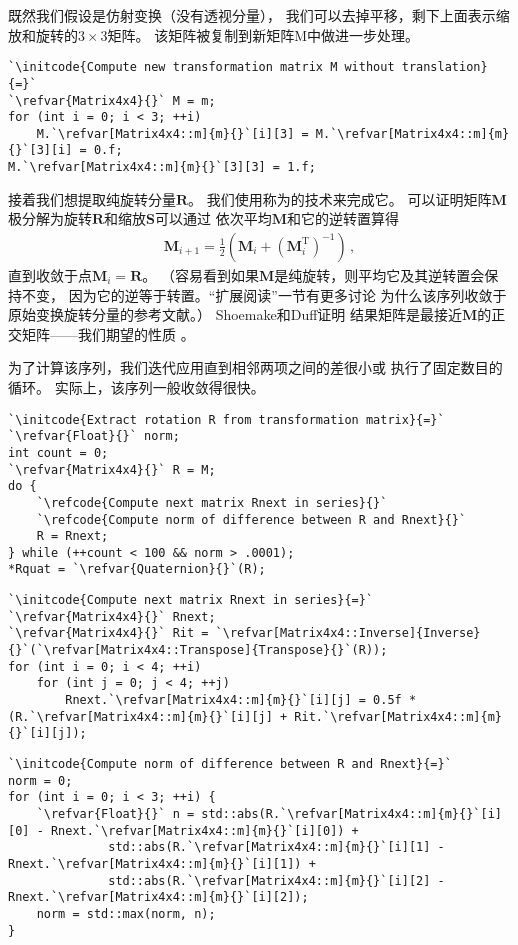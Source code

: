 既然我们假设是仿射变换（没有透视分量），
我们可以去掉平移，剩下上面表示缩放和旋转的$3\times3$矩阵。
该矩阵被复制到新矩阵{\ttfamily M}中做进一步处理。
\begin{lstlisting}
`\initcode{Compute new transformation matrix M without translation}{=}`
`\refvar{Matrix4x4}{}` M = m;
for (int i = 0; i < 3; ++i)
    M.`\refvar[Matrix4x4::m]{m}{}`[i][3] = M.`\refvar[Matrix4x4::m]{m}{}`[3][i] = 0.f;
M.`\refvar[Matrix4x4::m]{m}{}`[3][3] = 1.f;
\end{lstlisting}

接着我们想提取纯旋转分量$\bm R$。
我们使用称为的技术来完成它。
可以证明矩阵$\bm M$极分解为旋转$\bm R$和缩放$\bm S$可以通过
依次平均$\bm M$和它的逆转置算得
\begin{align}\label{eq:2.10}
    \bm M_{i+1}=\frac{1}{2}(\bm M_i+(\bm M_i^\mathrm{T})^{-1})\, ,
\end{align}
直到收敛于点$\bm M_i=\bm R$。
（容易看到如果$\bm M$是纯旋转，则平均它及其逆转置会保持不变，
因为它的逆等于转置。“扩展阅读”一节有更多讨论
为什么该序列收敛于原始变换旋转分量的参考文献。）
Shoemake和Duff\parencite*{10.5555/155294.155324}证明
结果矩阵是最接近$\bm M$的正交矩阵——我们期望的性质
。

为了计算该序列，我们迭代应用直到相邻两项之间的差很小或
执行了固定数目的循环。
实际上，该序列一般收敛得很快。
\begin{lstlisting}
`\initcode{Extract rotation R from transformation matrix}{=}`
`\refvar{Float}{}` norm;
int count = 0;
`\refvar{Matrix4x4}{}` R = M;
do {
    `\refcode{Compute next matrix Rnext in series}{}`
    `\refcode{Compute norm of difference between R and Rnext}{}`
    R = Rnext;
} while (++count < 100 && norm > .0001);
*Rquat = `\refvar{Quaternion}{}`(R);
\end{lstlisting}
\begin{lstlisting}
`\initcode{Compute next matrix Rnext in series}{=}`
`\refvar{Matrix4x4}{}` Rnext;
`\refvar{Matrix4x4}{}` Rit = `\refvar[Matrix4x4::Inverse]{Inverse}{}`(`\refvar[Matrix4x4::Transpose]{Transpose}{}`(R));
for (int i = 0; i < 4; ++i)
    for (int j = 0; j < 4; ++j)
        Rnext.`\refvar[Matrix4x4::m]{m}{}`[i][j] = 0.5f * (R.`\refvar[Matrix4x4::m]{m}{}`[i][j] + Rit.`\refvar[Matrix4x4::m]{m}{}`[i][j]);
\end{lstlisting}
\begin{lstlisting}
`\initcode{Compute norm of difference between R and Rnext}{=}`
norm = 0;
for (int i = 0; i < 3; ++i) {
    `\refvar{Float}{}` n = std::abs(R.`\refvar[Matrix4x4::m]{m}{}`[i][0] - Rnext.`\refvar[Matrix4x4::m]{m}{}`[i][0]) + 
              std::abs(R.`\refvar[Matrix4x4::m]{m}{}`[i][1] - Rnext.`\refvar[Matrix4x4::m]{m}{}`[i][1]) + 
              std::abs(R.`\refvar[Matrix4x4::m]{m}{}`[i][2] - Rnext.`\refvar[Matrix4x4::m]{m}{}`[i][2]);
    norm = std::max(norm, n);
}
\end{lstlisting}

